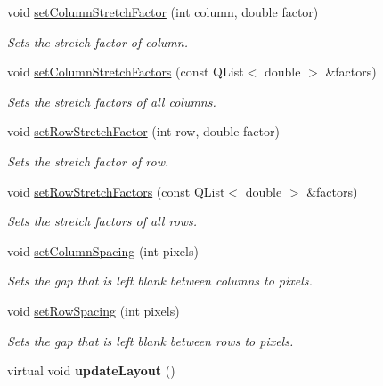 \begin{DoxyCompactItemize}
\item 
void \hyperlink{classQCPLayoutGrid_ae38f31a71687b9d7ee3104852528fb50}{set\+Column\+Stretch\+Factor} (int column, double factor)
\begin{DoxyCompactList}\small\item\em Sets the stretch {\itshape factor} of {\itshape column}. \end{DoxyCompactList}\item 
void \hyperlink{classQCPLayoutGrid_a6c2591d1a7e2534ce036989543b49e57}{set\+Column\+Stretch\+Factors} (const Q\+List$<$ double $>$ \&factors)
\begin{DoxyCompactList}\small\item\em Sets the stretch {\itshape factors} of all columns. \end{DoxyCompactList}\item 
void \hyperlink{classQCPLayoutGrid_a7b0273de5369bd93d942edbaf5b166ec}{set\+Row\+Stretch\+Factor} (int row, double factor)
\begin{DoxyCompactList}\small\item\em Sets the stretch {\itshape factor} of {\itshape row}. \end{DoxyCompactList}\item 
void \hyperlink{classQCPLayoutGrid_a200b45f9c908f96ebadaa3c8d87a2782}{set\+Row\+Stretch\+Factors} (const Q\+List$<$ double $>$ \&factors)
\begin{DoxyCompactList}\small\item\em Sets the stretch {\itshape factors} of all rows. \end{DoxyCompactList}\item 
void \hyperlink{classQCPLayoutGrid_a3a49272aba32bb0fddc3bb2a45a3dba0}{set\+Column\+Spacing} (int pixels)
\begin{DoxyCompactList}\small\item\em Sets the gap that is left blank between columns to {\itshape pixels}. \end{DoxyCompactList}\item 
void \hyperlink{classQCPLayoutGrid_aaef2cd2d456197ee06a208793678e436}{set\+Row\+Spacing} (int pixels)
\begin{DoxyCompactList}\small\item\em Sets the gap that is left blank between rows to {\itshape pixels}. \end{DoxyCompactList}\item 
\hypertarget{classQCPLayoutGrid_a07f8dd7d3d61d7345026621d446042a4}{}virtual void {\bfseries update\+Layout} ()\label{classQCPLayoutGrid_a07f8dd7d3d61d7345026621d446042a4}


\end{DoxyCompactItemize}
